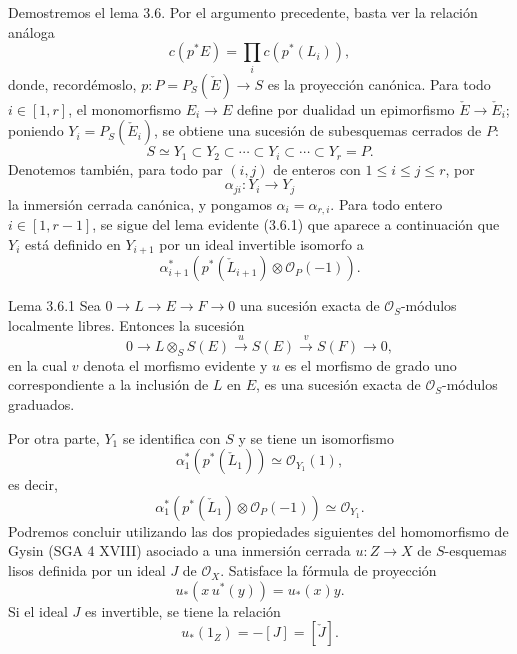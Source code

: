 Demostremos el lema 3.6. Por el argumento precedente, basta ver la relación análoga
\[
c(p^*E)=\prod_i c(p^*(L_i)),
\]
donde, recordémoslo, $p:P=P_S(\check E)\to S$ es la proyección canónica. Para todo $i\in[1,r]$, el monomorfismo $E_i\to E$ define por dualidad un epimorfismo $\check E\to\check E_i$; poniendo $Y_i=P_S(\check E_i)$, se obtiene una sucesión de subesquemas cerrados de $P$:
\[
S\simeq Y_1\subset Y_2\subset\cdots\subset Y_i\subset\cdots\subset Y_r=P.
\]
Denotemos también, para todo par $(i,j)$ de enteros con $1\le i\le j\le r$, por
\[
\alpha_{ji}:Y_i\to Y_j
\]
la inmersión cerrada canónica, y pongamos $\alpha_i=\alpha_{r,i}$. Para todo entero $i\in[1,r-1]$, se sigue del lema evidente (3.6.1) que aparece a continuación que $Y_i$ está definido en $Y_{i+1}$ por un ideal invertible isomorfo a
\[
\alpha_{i+1}^*(p^*(\check L_{i+1})\otimes\mathcal O_P(-1)).
\]

\begin{statement}{Lema 3.6.1}
Sea $0\to L\to E\to F\to0$ una sucesión exacta de $\mathcal O_S$-módulos localmente libres. Entonces la sucesión
\[
0\to L\otimes_S S(E)\xrightarrow{u}S(E)\xrightarrow{v}S(F)\to0,
\]
en la cual $v$ denota el morfismo evidente y $u$ es el morfismo de grado uno correspondiente a la inclusión de $L$ en $E$, es una sucesión exacta de $\mathcal O_S$-módulos graduados.
\end{statement}

Por otra parte, $Y_1$ se identifica con $S$ y se tiene un isomorfismo
\[
\alpha_1^*(p^*(\check L_1))\simeq\mathcal O_{Y_1}(1),
\]
es decir,
\[
\alpha_1^*(p^*(\check L_1)\otimes\mathcal O_P(-1))\simeq \mathcal O_{Y_1}.
\tag{3.6.2}
\]
Podremos concluir utilizando las dos propiedades siguientes del homomorfismo de Gysin (SGA 4 XVIII) asociado a una inmersión cerrada $u:Z\to X$ de $S$-esquemas lisos definida por un ideal $J$ de $\mathcal O_X$. Satisface la fórmula de proyección
\[
u_*(x\,u^*(y))=u_*(x)y.
\tag{3.6.3}
\]
Si el ideal $J$ es invertible, se tiene la relación
\[
u_*(1_Z)=-[J]=[\check J].
\tag{3.6.4}
\]
